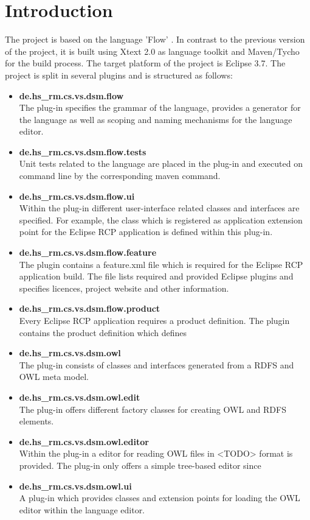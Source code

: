 \section{Introduction}
The project is based on the language 'Flow' \cite{297:Frey2010}. In contrast to 
the previous version of the project, it is built using Xtext 2.0 as language 
toolkit and Maven/Tycho for the build process. The target platform of the 
project is Eclipse 3.7. The project is split in several plugins and is 
structured as follows:
\begin{itemize}
  \item \textbf{de.hs\_rm.cs.vs.dsm.flow} \\
  The plug-in specifies the grammar of the language, provides a generator for 
  the language as well as scoping and naming mechanisms for the language editor.
  \item \textbf{ de.hs\_rm.cs.vs.dsm.flow.tests} \\
  Unit tests related to the language are placed in the plug-in and executed on 
  command line by the corresponding maven command.
  \item \textbf{de.hs\_rm.cs.vs.dsm.flow.ui} \\
  Within the plug-in different user-interface related classes and interfaces are
  specified. For example, the class which is registered as application extension 
  point for the Eclipse RCP application is defined within this plug-in.
  \item \textbf{de.hs\_rm.cs.vs.dsm.flow.feature} \\
  The plugin contains a feature.xml file which is required for the Eclipse RCP 
  application build. The file lists required and provided Eclipse plugins and 
  specifies licences, project website and other information.
  \item \textbf{de.hs\_rm.cs.vs.dsm.flow.product} \\
  Every Eclipse RCP application requires a product definition. The plugin 
  contains the product definition which defines
  \item \textbf{de.hs\_rm.cs.vs.dsm.owl} \\
  The plug-in consists of classes and interfaces generated from a RDFS and OWL 
  meta model.
  \item \textbf{de.hs\_rm.cs.vs.dsm.owl.edit} \\
  The plug-in offers different factory classes for creating OWL and RDFS 
  elements.
  \item \textbf{de.hs\_rm.cs.vs.dsm.owl.editor} \\
  Within the plug-in a editor for reading OWL files in <TODO> format is 
  provided. The plug-in only offers a simple tree-based editor since
  \item \textbf{de.hs\_rm.cs.vs.dsm.owl.ui} \\
  A plug-in which provides classes and extension points for loading the OWL 
  editor within the language editor. 
\end{itemize}
